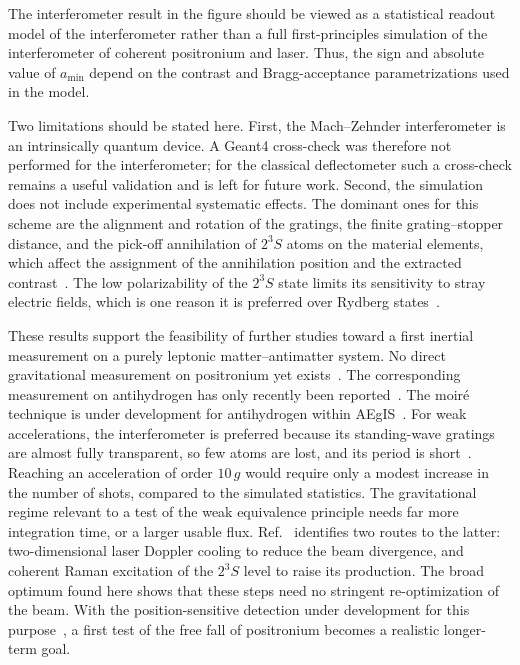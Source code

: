 \documentclass[12pt]{report}
\begin{document}
The interferometer result in the figure should be viewed as a statistical readout model of the interferometer rather than a full first-principles simulation of the interferometer of coherent positronium and laser. Thus, the sign and absolute value of $a_{\min}$ depend on the contrast and Bragg-acceptance parametrizations used in the model. %

Two limitations should be stated here. First, the Mach--Zehnder interferometer is an intrinsically quantum device. A Geant4 cross-check was therefore not performed for the interferometer; for the classical deflectometer such a cross-check remains a useful validation and is left for future work. Second, the simulation does not include experimental systematic effects. The dominant ones for this scheme are the alignment and rotation of the gratings, the finite grating--stopper distance, and the pick-off annihilation of $2^3S$ atoms on the material elements, which affect the assignment of the annihilation position and the extracted contrast~\cite{Mariazzi_Caravita_Doser_Nebbia_Brusa_2020,Cooke2015}. The low polarizability of the $2^3S$ state limits its sensitivity to stray electric fields, which is one reason it is preferred over Rydberg states~\cite{Cassidy_2018,Mariazzi_Caravita_Doser_Nebbia_Brusa_2020}.

These results support the feasibility of further studies toward a first inertial measurement on a purely leptonic matter--antimatter system. No direct gravitational measurement on positronium yet exists~\cite{Bass_Mariazzi_Moskal_Stepien_2023,Mariazzi_Caravita_Doser_Nebbia_Brusa_2020}. The corresponding measurement on antihydrogen has only recently been reported~\cite{Anderson_etal_2023}. The moir\'e technique is under development for antihydrogen within AEgIS~\cite{Ferguson_AEḡISCollaboration_2025}. For weak accelerations, the interferometer is preferred because its standing-wave gratings are almost fully transparent, so few atoms are lost, and its period is short~\cite{Mariazzi_Caravita_Doser_Nebbia_Brusa_2020,Oberthaler_2002}. Reaching an acceleration of order $10\,g$ would require only a modest increase in the number of shots, compared to the simulated statistics. The gravitational regime relevant to a test of the weak equivalence principle needs far more integration time, or a larger usable flux. Ref.~\cite{Mariazzi_Caravita_Doser_Nebbia_Brusa_2020} identifies two routes to the latter: two-dimensional laser Doppler cooling to reduce the beam divergence, and coherent Raman excitation of the $2^3S$ level to raise its production. The broad optimum found here shows that these steps need no stringent re-optimization of the beam. With the position-sensitive detection under development for this purpose~\cite{Sharma_Baran_Brusa_Caravita_Chug_Coussat_Curceanu_Czerwiński_Dadgar_Dulski_etal._2023,Sharma_Povolo_Mariazzi_Korcyl_Kacprzak_Kumar_Niedźwiecki_Baran_Beyene_Brusa_etal._2024}, a first test of the free fall of positronium becomes a realistic longer-term goal.
\end{document}
